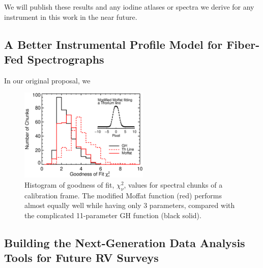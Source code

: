 \documentclass[12pt]{article}
\begin{document}
We will publish these results and any iodine atlases or spectra we
derive for any instrument in this work in the near future.


\vspace{-10pt}
\subsection{A Better Instrumental Profile Model for Fiber-Fed Spectrographs}\label{sec:ip}
\vspace{-5pt}

In our original proposal, we

\begin{figure}
  \vspace{-35pt}
  \begin{center}
    \includegraphics[width=0.55\textwidth]{thar_vs_moffat}
  \end{center}
  \vspace{-25pt}  
  \caption{Histogram of goodness of fit, $\chi_\nu^2$, values for
    spectral chunks of a calibration frame. The modified Moffat
    function (red) performs almost equally well while having only 3
    parameters, compared with the complicated 11-parameter GH function
    (black solid).} 
  \vspace{-8pt}  
  \label{fig:ip}
\end{figure}


\vspace{-10pt}
\subsection{Building the Next-Generation Data Analysis Tools for Future RV Surveys}\label{sec:newrv}
\vspace{-5pt}
\end{document}
